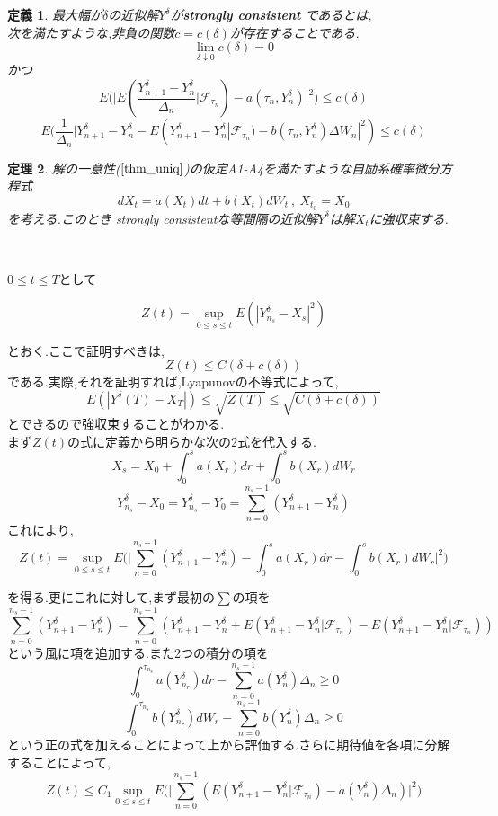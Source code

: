 \documentclass[a4paper,dvipdfmx]{jreport}
\def\qedsymbol{$\square$}
\def\proofname{\gt{証明}\;}
\newenvironment{Proof}{\par\noindent{\it\proofname}}{{\unskip\nobreak\hfill{\it\qedsymbol}}\par\vskip 9pt}
\numberwithin{equation}{section}
\newtheorem{Thm}     {定理}[section]
\newtheorem{Def}     [Thm]{定義}
\renewenvironment{leftbar}{%
  \def\FrameCommand{\vrule width 1pt \hspace{10pt}}%
  \MakeFramed {\advance\hsize-\width \FrameRestore}}%
 {\endMakeFramed}
\def\F{\mathcal F}
\def\thm{\begin{leftbar}\begin{Thm}}
\def\thmx{\end{Thm}\end{leftbar}}
\def\defb{\begin{leftbar}\begin{Def}}
\def\defx{\end{Def}\end{leftbar}}
\def\proof{\begin{Proof}}
\def\gt{>}
\begin{document}
\defb
最大幅が$\delta$の近似解$Y^\delta$が{\bf strongly consistent} であるとは,\\
次を満たすような,非負の関数$c = c(\delta)$が存在することである.
\[
\lim_{\delta \downarrow 0} c(\delta) = 0 
\]
かつ
\[
E \big( \big| E( \frac{Y^\delta_{n+1} - Y^\delta_n}{\Delta_n} | \F_{\tau_n})
- a(\tau_n,Y_n^\delta)
 \big|^2 \big)   \le c(\delta)
\]
\[
E(\frac{1}{\Delta_n} | Y^\delta_{n+1} - Y^\delta_n
- E(Y^\delta_{n+1} - Y^\delta_n | \F_{\tau_n})
- b(\tau_n,Y_n^\delta)\Delta W_n|^2) \le c(\delta)
\]

\defx

\thm

解の一意性($\ref{thm_uniq}$)の仮定A1-A4を満たすような自励系確率微分方程式
\[
dX_t = a(X_t)dt + b(X_t)dW_t \ ,\ X_{t_0} =X_0
\]
を考える.このとき strongly consistentな等間隔の近似解$Y^\delta$は解$X_t$に強収束する.
\thmx
\leavevmode\\
\proof

$0 \le t \le T$として

\[
Z(t) = \sup_{0\le s\le t} E(|Y_{n_s}^\delta - X_s|^2)
\]

とおく.ここで証明すべきは,
\[
Z(t) \le C(\delta + c(\delta))
\]
である.実際,それを証明すれば,Lyapunovの不等式によって,
\[
E(|Y^\delta(T) - X_T|) \le \sqrt{Z(T)} \le \sqrt{C(\delta+c(\delta))}
\]
とできるので強収束することがわかる.\\
まず$Z(t)$の式に定義から明らかな次の2式を代入する.
\[
X_s = X_0 + \int_0^s a(X_r)dr + \int_0^s b(X_r) dW_r
\]
\[
Y_{n_s}^\delta - X_0 =  Y_{n_s}^\delta - Y_0 = \sum_{n=0}^{n_s-1}(Y_{n+1}^\delta - Y_n^\delta)
\]
これにより,
\[
Z(t) = \sup_{0\le s\le t}  E 
\big(  \big|
 \sum_{n=0}^{n_s-1}(Y_{n+1}^\delta - Y_n^\delta) - \int_0^s a(X_r)dr - \int_0^s b(X_r) dW_r
\big| ^2 \big)
\]

を得る.更にこれに対して,まず最初の$\sum$の項を
\[
\sum_{n=0}^{n_s-1}(Y_{n+1}^\delta - Y_n^\delta) = \sum_{n=0}^{n_s-1}(Y_{n+1}^\delta - Y_n^\delta 
+ E(Y_{n+1}^\delta - Y_n^\delta | \F_{\tau_n}) - E(Y_{n+1}^\delta - Y_n^\delta | \F_{\tau_n}))
\]
という風に項を追加する.また2つの積分の項を
\[
\int_0^{\tau_{n_s}} a(Y^\delta_{n_r})dr - \sum_{n=0}^{n_s-1} a(Y_n^\delta)\Delta_n \ge 0
\]
\[
\int_0^{\tau_{n_s}} b(Y^\delta_{n_r})dW_r - \sum_{n=0}^{n_s-1} b(Y_n^\delta)\Delta_n \ge 0
\]
という正の式を加えることによって上から評価する.さらに期待値を各項に分解することによって,
\[
Z(t)\le C_1  \sup_{0\le s\le t} 
E \big(  \big|
\sum_{n=0}^{n_s-1} (E(Y_{n+1}^\delta - Y_n^\delta | \F_{\tau_n}) - a(Y_n^\delta)\Delta_n )
\big| ^2 \big)
\]
\end{document}
